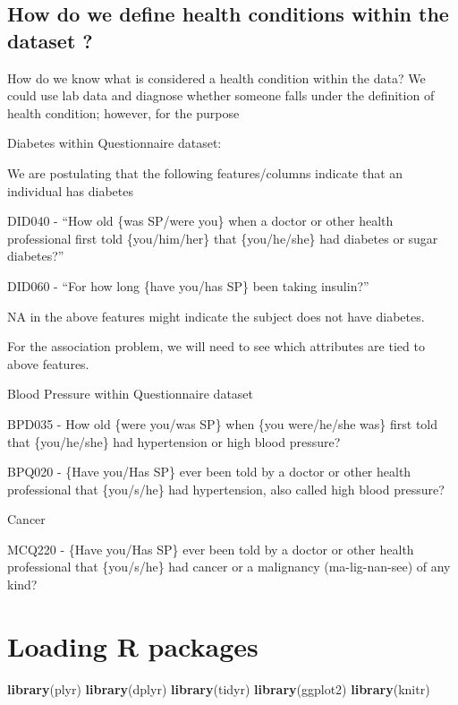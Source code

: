 \documentclass[]{article}
\newenvironment{Shaded}{\begin{snugshade}}{\end{snugshade}}
\newcommand{\KeywordTok}[1]{\textcolor[rgb]{0.13,0.29,0.53}{\textbf{#1}}}
\newcommand{\NormalTok}[1]{#1}
\begin{document}
\hypertarget{how-do-we-define-health-conditions-within-the-dataset}{%
\subsection{How do we define health conditions within the dataset
?}\label{how-do-we-define-health-conditions-within-the-dataset}}

How do we know what is considered a health condition within the data? We
could use lab data and diagnose whether someone falls under the
definition of health condition; however, for the purpose

Diabetes within Questionnaire dataset:

We are postulating that the following features/columns indicate that an
individual has diabetes

DID040 - ``How old \{was SP/were you\} when a doctor or other health
professional first told \{you/him/her\} that \{you/he/she\} had diabetes
or sugar diabetes?''

DID060 - ``For how long \{have you/has SP\} been taking insulin?''

NA in the above features might indicate the subject does not have
diabetes.

For the association problem, we will need to see which attributes are
tied to above features.

Blood Pressure within Questionnaire dataset

BPD035 - How old \{were you/was SP\} when \{you were/he/she was\} first
told that \{you/he/she\} had hypertension or high blood pressure?

BPQ020 - \{Have you/Has SP\} ever been told by a doctor or other health
professional that \{you/s/he\} had hypertension, also called high blood
pressure?

Cancer

MCQ220 - \{Have you/Has SP\} ever been told by a doctor or other health
professional that \{you/s/he\} had cancer or a malignancy
(ma-lig-nan-see) of any kind?

\hypertarget{loading-r-packages}{%
\section{Loading R packages}\label{loading-r-packages}}

\begin{Shaded}
\begin{Highlighting}[]
\KeywordTok{library}\NormalTok{(plyr)}
\KeywordTok{library}\NormalTok{(dplyr)}
\KeywordTok{library}\NormalTok{(tidyr)}
\KeywordTok{library}\NormalTok{(ggplot2)}
\KeywordTok{library}\NormalTok{(knitr)}
\end{Highlighting}
\end{Shaded}
\end{document}
